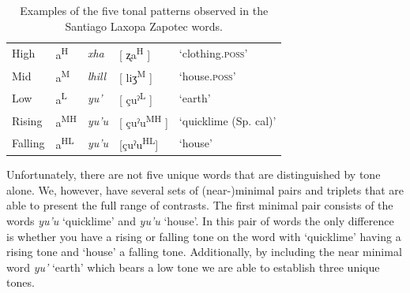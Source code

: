 \documentclass[12pt, letterpaper]{article}
\newcommand{\supr}[1]{\textsuperscript{#1}}
\providecommand{\lsptoprule}{\midrule\toprule}
\providecommand{\lspbottomrule}{\bottomrule\midrule}
\begin{document}


\begin{table}[!h]
	\centering
	\caption{Examples of the five tonal patterns observed in the Santiago Laxopa Zapotec words.}
	\label{tab:tones}
	 \begin{tabular}{lllll}
	  \lsptoprule
	  High   	&  a\supr{H}  &  \textit{xha}   &  [ ʐa\supr{H} ] & `clothing.\textsc{poss}'\\
		Mid    	&  a\supr{M}  &  \textit{lhill} 	& [ liʒ\supr{M} ] & `house.\textsc{poss}' \\
		Low   	&  a\supr{L}  &  \textit{yu'} 	&	 [ çuˀ\supr{L} ] & `earth'\\
		Rising	&  a\supr{MH}  &  \textit{yu'u} 	&	[ çuˀu\supr{MH} ] & `quicklime (Sp. cal)' \\
		Falling &  a\supr{HL}  &  \textit{yu'u}  &	[çuˀu\supr{HL}] &	`house' \\
	  \lspbottomrule
	 \end{tabular}
\end{table}

Unfortunately, there are not five unique words that are distinguished by tone alone. We, however, have several sets of (near-)minimal pairs and triplets that are able to present the full range of contrasts. The first minimal pair consists of the words \textit{yu'u} `quicklime' and \textit{yu'u} `house'. In this pair of words the only difference is whether you have a rising or falling tone on the word with `quicklime' having a rising tone and `house' a falling tone. Additionally, by including the near minimal word \textit{yu'} `earth' which bears a low tone we are able to establish three unique tones. 
\end{document}
